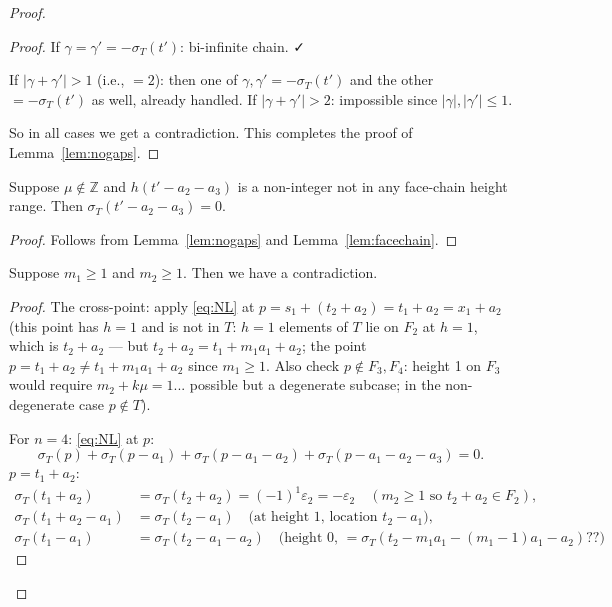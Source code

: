 \begin{proof}
\begin{proof}
If $\gamma = \gamma' = -\sigma_T(t')$: bi-infinite chain. ✓

If $|\gamma+\gamma'| > 1$ (i.e., $=2$): then one of $\gamma,\gamma' = -\sigma_T(t')$ and the other $= -\sigma_T(t')$ as well, already handled. If $|\gamma+\gamma'| > 2$: impossible since $|\gamma|,|\gamma'| \leq 1$.

So in all cases we get a contradiction. This completes the proof of Lemma~\ref{lem:nogaps}.
\end{proof}

\bigskip

\begin{lemma}[a3vanish]\label{lem:a3vanish}
Suppose $\mu \notin \mathbb{Z}$ and $h(t'-a_2-a_3)$ is a non-integer not in any face-chain height range. Then $\sigma_T(t'-a_2-a_3)=0$.
\end{lemma}
\begin{proof}
Follows from Lemma~\ref{lem:nogaps} and Lemma~\ref{lem:facechain}.
\end{proof}

\bigskip

\begin{lemma}\label{lem:cross}
Suppose $m_1 \geq 1$ and $m_2 \geq 1$. Then we have a contradiction.
\end{lemma}
\begin{proof}
The cross-point: apply \eqref{eq:NL} at $p = s_1 + (t_2 + a_2) = t_1 + a_2 = x_1 + a_2$ (this point has $h = 1$ and is not in $T$: $h=1$ elements of $T$ lie on $F_2$ at $h=1$, which is $t_2+a_2$ — but $t_2+a_2 = t_1+m_1a_1+a_2$; the point $p = t_1+a_2 \neq t_1+m_1a_1+a_2$ since $m_1 \geq 1$. Also check $p \notin F_3,F_4$: height 1 on $F_3$ would require $m_2+k\mu=1$... possible but a degenerate subcase; in the non-degenerate case $p \notin T$).

For $n=4$: \eqref{eq:NL} at $p$:
\[
  \sigma_T(p) + \sigma_T(p-a_1) + \sigma_T(p-a_1-a_2) + \sigma_T(p-a_1-a_2-a_3) = 0.
\]
$p = t_1+a_2$:
\begin{align*}
  \sigma_T(t_1+a_2) &= \sigma_T(t_2+a_2) = (-1)^1 \varepsilon_2 = -\varepsilon_2 \quad (m_2 \geq 1 \text{ so } t_2+a_2 \in F_2),\\
  \sigma_T(t_1+a_2-a_1) &= \sigma_T(t_2-a_1) \quad \text{(at height 1, location } t_2-a_1),\\
  \sigma_T(t_1-a_1) &= \sigma_T(t_2-a_1-a_2)\quad \text{(height 0, }= \sigma_T(t_2-m_1a_1-(m_1-1)a_1-a_2)??)
\end{align*}


\end{proof}
\end{proof}
